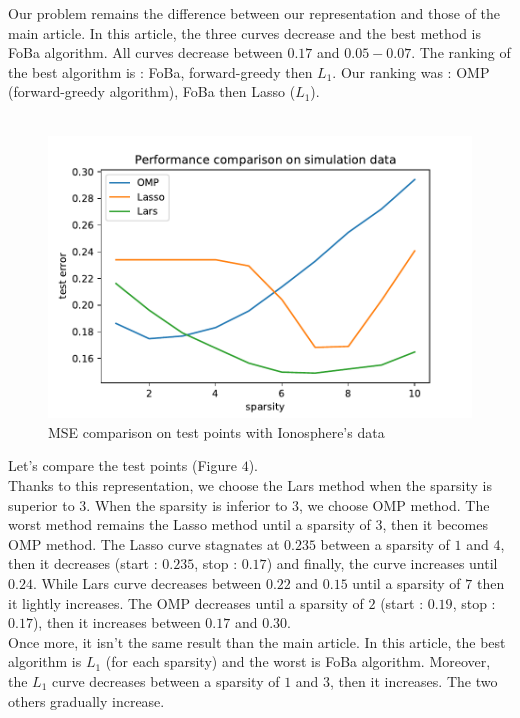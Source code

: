 \documentclass{article}
\begin{document}
Our problem remains the difference between our representation and those of the main article. In this article, the three curves decrease and the best method is FoBa algorithm. All curves decrease between $0.17$ and $0.05-0.07$. The ranking of the best algorithm is : FoBa, forward-greedy then $L_1$. Our ranking was : OMP (forward-greedy algorithm), FoBa then Lasso ($L_1$).\\
\\
\begin{figure}[!ht]
    \centering
    \includegraphics[scale=0.5]{./images/test_error_ionosphere.pdf}
    \caption{MSE comparison on test points with Ionosphere's data}
    \label{Figure 4}
\end{figure}
Let's compare the test points (Figure $4$).\\
Thanks to this representation, we choose the Lars method when the sparsity is superior to $3$. When the sparsity is inferior to $3$, we choose OMP method. The worst method remains the Lasso method until a sparsity of $3$, then it becomes OMP method. The Lasso curve stagnates at $0.235$ between a sparsity of $1$ and $4$, then it decreases (start : $0.235$, stop : $0.17$) and finally, the curve increases until $0.24$. While Lars curve decreases between $0.22$ and $0.15$ until a sparsity of $7$ then it lightly increases. The OMP decreases until a sparsity of $2$ (start : $0.19$, stop : $0.17$), then it increases between $0.17$ and $0.30$.\\
Once more, it isn't the same result than the main article. In this article, the best algorithm is $L_1$ (for each sparsity) and the worst is  FoBa algorithm. Moreover, the $L_1$ curve decreases between a sparsity of $1$ and $3$, then it increases. The two others gradually increase.\\ 
\end{document}
